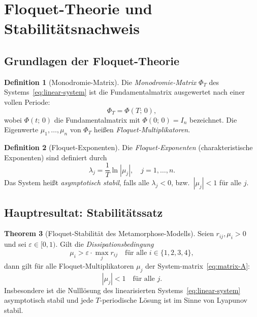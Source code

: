 ﻿\documentclass[12pt, a4paper]{article}
\theoremstyle{definition}
\newtheorem{theorem}{Theorem}[section]
\newtheorem{definition}[theorem]{Definition}
\begin{document}
\section{Floquet-Theorie und Stabilitätsnachweis}

\subsection{Grundlagen der Floquet-Theorie}

\begin{definition}[Monodromie-Matrix]\label{def:monodromy}
Die \emph{Monodromie-Matrix} $\Phi_T$ des Systems~\eqref{eq:linear-system} ist
die Fundamentalmatrix ausgewertet nach einer vollen Periode:
\[
  \Phi_T = \Phi(T;\,0),
\]
wobei $\Phi(t;\,0)$ die Fundamentalmatrix mit $\Phi(0;\,0) = I_n$ bezeichnet.
Die Eigenwerte $\mu_1, \ldots, \mu_n$ von $\Phi_T$ heißen \emph{Floquet-Multiplikatoren}.
\end{definition}

\begin{definition}[Floquet-Exponenten]\label{def:floquet-exp}
Die \emph{Floquet-Exponenten} (charakteristische Exponenten) sind definiert durch
\[
  \lambda_j = \frac{1}{T}\ln|\mu_j|, \quad j = 1, \ldots, n.
\]
Das System heißt \emph{asymptotisch stabil}, falls alle $\lambda_j < 0$, bzw.\
$|\mu_j| < 1$ für alle $j$.
\end{definition}

\subsection{Hauptresultat: Stabilitätssatz}

\begin{theorem}[Floquet-Stabilität des Metamorphose-Modells]\label{thm:floquet}
Seien $r_{ij}, \mu_i > 0$ und sei $\varepsilon \in [0, 1)$. Gilt die
\emph{Dissipationsbedingung}
\begin{equation}\label{eq:dissipation}
  \mu_i > \varepsilon \cdot \max_{j} r_{ij} \quad \text{für alle } i \in \{1,2,3,4\},
\end{equation}
dann gilt für alle Floquet-Multiplikatoren $\mu_j$ der System-matrix~\eqref{eq:matrix-A}:
\[
  |\mu_j| < 1 \quad \text{für alle } j.
\]
Insbesondere ist die Nulllösung des linearisierten Systems~\eqref{eq:linear-system}
asymptotisch stabil und jede $T$-periodische Lösung ist im Sinne von Lyapunov
stabil.
\end{theorem}
\end{document}
